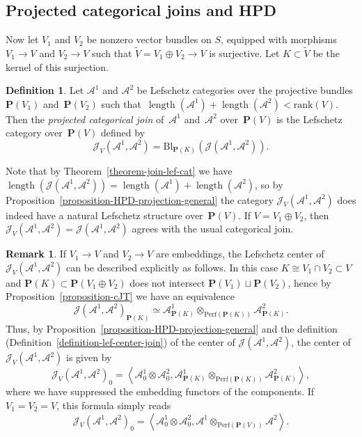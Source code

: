 \documentclass[11pt, reqno]{amsart}
\numberwithin{equation}{section}
\theoremstyle{plain}
\theoremstyle{definition}
\newtheorem{definition}[theorem]{Definition}
\newtheorem{remark}[theorem]{Remark}
\newcommand{\Perf}{\mathrm{Perf}}
\DeclareMathOperator{\length}{\mathrm{length}}
\newcommand{\llangle}{\left \langle}
\newcommand{\rrangle}{\right \rangle}
\newcommand{\Bl}{\mathrm{Bl}}
\newcommand{\tV}{\tilde{V}}
\newcommand{\rank}{\mathrm{rank}}
\newcommand{\cA}{\mathcal{A}}
\newcommand{\cJ}{\mathcal{J}}
\newcommand{\bP}{\mathbf{P}}
\begin{document}
\subsection{Projected categorical joins and HPD}
Now let $V_1$ and $V_2$ be nonzero vector bundles on $S$, 
equipped with morphisms $V_1 \to V$ and $V_2 \to V$ such that $\tV = V_1 \oplus V_2 \to V$ is surjective. 
Let $K \subset \tV$ be the kernel of this surjection. 

\begin{definition}
\label{definition-relative-join}
Let $\cA^1$ and $\cA^2$ be Lefschetz categories over the projective bundles $\bP(V_1)$ and~$\bP(V_2)$ 
such that~$\length(\cA^1) + \length(\cA^2) < \rank(V)$. 
Then the \emph{projected categorical join} of~$\cA^1$ and~$\cA^2$ over~$\bP(V)$ is 
the Lefschetz category over~$\bP(V)$ defined by 
\begin{equation*}
\cJ_V(\cA^1, \cA^2) = \Bl_{\bP(K)}(\cJ(\cA^1, \cA^2)). 
\end{equation*} 
\end{definition}

Note that by Theorem~\ref{theorem-join-lef-cat} we have $\length(\cJ(\cA^1, \cA^2)) = \length(\cA^1) + \length(\cA^2)$, 
so by Proposition~\ref{proposition-HPD-projection-general} 
the category $\cJ_V(\cA^1, \cA^2)$ does indeed have a natural Lefschetz structure 
over~$\bP(V)$. 
If $V = V_1 \oplus V_2$, then $\cJ_V(\cA^1, \cA^2) = \cJ(\cA^1, \cA^2)$ agrees with the usual categorical join. 

\begin{remark}
\label{remark-projected-join-center} 
If $V_1 \to V$ and $V_2 \to V$ are embeddings, the Lefschetz center of $\cJ_V(\cA^1, \cA^2)$ can 
be described explicitly as follows. 
In this case $K \cong V_1 \cap V_2 \subset V$
and $\bP(K) \subset \bP(V_1 \oplus V_2)$ does not intersect $\bP(V_1) \sqcup \bP(V_2)$, hence 
by Proposition~\ref{proposition-cJT} we have an equivalence 
\begin{equation*}
\cJ(\cA^1, \cA^2)_{\bP(K)} \simeq \cA^1_{\bP(K)} \otimes_{\Perf(\bP(K))} \cA^2_{\bP(K)} . 
\end{equation*}
Thus, by Proposition~\ref{proposition-HPD-projection-general} and the definition (Definition~\ref{definition-lef-center-join}) 
of the center of $\cJ(\cA^1, \cA^2)$, the center of $\cJ_V(\cA^1, \cA^2)$ is given by 
\begin{equation*}
\cJ_V(\cA^1, \cA^2)_0 = \llangle \cA_0^1 \otimes \cA_0^2, \cA^1_{\bP(K)} \otimes_{\Perf(\bP(K))} \cA^2_{\bP(K)} \rrangle, 
\end{equation*} 
where we have suppressed the embedding functors of the components. 
If $V_1 = V_2 = V$, this formula simply reads 
\begin{equation*}
\cJ_V(\cA^1, \cA^2)_0 = \llangle \cA_0^1 \otimes \cA_0^2 , \cA^1 \otimes_{\Perf(\bP(V))} \cA^2 \rrangle. 
\end{equation*}
\end{remark}
\end{document}
